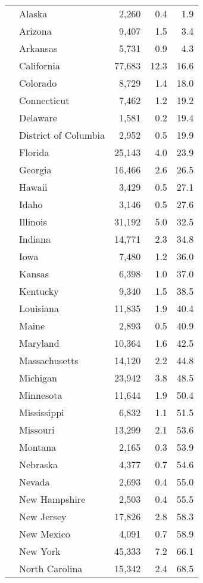 \begin{longtable}{ll|rrr}
    & Alaska & 2,260 & 0.4 & 1.9 \\ 
    & Arizona & 9,407 & 1.5 & 3.4 \\ 
    & Arkansas & 5,731 & 0.9 & 4.3 \\ 
    & California & 77,683 & 12.3 & 16.6 \\ 
    & Colorado & 8,729 & 1.4 & 18.0 \\ 
    & Connecticut & 7,462 & 1.2 & 19.2 \\ 
    & Delaware & 1,581 & 0.2 & 19.4 \\ 
    & District of Columbia & 2,952 & 0.5 & 19.9 \\ 
    & Florida & 25,143 & 4.0 & 23.9 \\ 
    & Georgia & 16,466 & 2.6 & 26.5 \\ 
    & Hawaii & 3,429 & 0.5 & 27.1 \\ 
    & Idaho & 3,146 & 0.5 & 27.6 \\ 
    & Illinois & 31,192 & 5.0 & 32.5 \\ 
    & Indiana & 14,771 & 2.3 & 34.8 \\ 
    & Iowa & 7,480 & 1.2 & 36.0 \\ 
    & Kansas & 6,398 & 1.0 & 37.0 \\ 
    & Kentucky & 9,340 & 1.5 & 38.5 \\ 
    & Louisiana & 11,835 & 1.9 & 40.4 \\ 
    & Maine & 2,893 & 0.5 & 40.9 \\ 
    & Maryland & 10,364 & 1.6 & 42.5 \\ 
    & Massachusetts & 14,120 & 2.2 & 44.8 \\ 
    & Michigan & 23,942 & 3.8 & 48.5 \\ 
    & Minnesota & 11,644 & 1.9 & 50.4 \\ 
    & Mississippi & 6,832 & 1.1 & 51.5 \\ 
    & Missouri & 13,299 & 2.1 & 53.6 \\ 
    & Montana & 2,165 & 0.3 & 53.9 \\ 
    & Nebraska & 4,377 & 0.7 & 54.6 \\ 
    & Nevada & 2,693 & 0.4 & 55.0 \\ 
    & New Hampshire & 2,503 & 0.4 & 55.5 \\ 
    & New Jersey & 17,826 & 2.8 & 58.3 \\ 
    & New Mexico & 4,091 & 0.7 & 58.9 \\ 
    & New York & 45,333 & 7.2 & 66.1 \\ 
    & North Carolina & 15,342 & 2.4 & 68.5 \\ 

\end{longtable}

